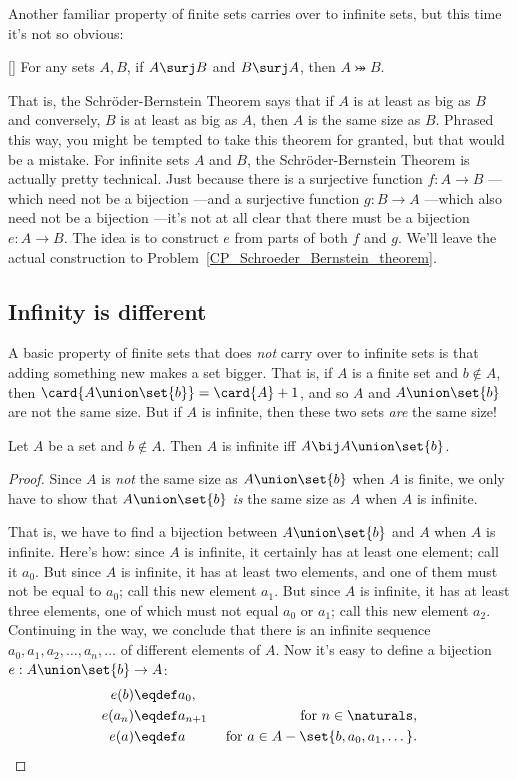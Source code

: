 Another familiar property of finite sets carries over to infinite sets,
but this time it's not so obvious:
\begin{theorem}\label{S-B_thm} \mbox{}
 [] For any sets $A,B$, if $A \surj B$ and
 $B \surj A$, then $A \bij B$.
\end{theorem}

That is, the Schr\"oder-Bernstein Theorem says that if $A$ is at least as
big as $B$ and conversely, $B$ is at least as big as $A$, then $A$ is the
same size as $B$.  Phrased this way, you might be tempted to take this
theorem for granted, but that would be a mistake.  For infinite sets $A$
and $B$, the Schr\"oder-Bernstein Theorem is actually pretty technical.
Just because there is a surjective function $f:A\to B$ ---which need not
be a bijection ---and a surjective function $g:B \to A$ ---which also need
not be a bijection ---it's not at all clear that there must be a bijection
$e:A \to B$.  The idea is to construct $e$ from parts of both $f$ and $g$.
We'll leave the actual construction to
Problem~\ref{CP_Schroeder_Bernstein_theorem}.

\subsection{Infinity is different}

A basic property of finite sets that does \emph{not} carry over to
infinite sets is that adding something new makes a set bigger.  That is,
if $A$ is a finite set and $b \notin A$, then $\card{A \union \set{b}} =
\card{A}+1$, and so $A$ and $A \union \set{b}$ are not the same size.  But
if $A$ is infinite, then these two sets \emph{are} the same size!

\begin{lemma}\label{AUb}
  Let $A$ be a set and $b \notin A$.  Then $A$ is infinite iff $A \bij A
  \union \set{b}$.
\end{lemma}
\begin{proof}
  Since $A$ is \emph{not} the same size as $A \union \set{b}$ when $A$ is
  finite, we only have to show that $A \union \set{b}$ \emph{is} the same
  size as $A$ when $A$ is infinite.

That is, we have to find a bijection between $A \union \set{b}$ and $A$
when $A$ is infinite.  Here's how: since $A$ is infinite, it certainly has
at least one element; call it $a_0$.  But since $A$ is infinite, it has at
least two elements, and one of them must not be equal to $a_0$; call this
new element $a_1$.  But since $A$ is infinite, it has at least three
elements, one of which must not equal $a_0$ or $a_1$; call this new
element $a_2$.  Continuing in the way, we conclude that there is an
infinite sequence $a_0,a_1,a_2,\dots,a_n,\dots$ of different elements of
$A$.  Now it's easy to define a bijection $e: A \union \set{b} \to A$:
\begin{align*}
e(b) & \eqdef a_0,\\
e(a_n) & \eqdef a_{n+1}  &\text{ for } n \in \naturals,\\
e(a) & \eqdef a & \text{ for } a \in A - \set{b,a_0,a_1,\dots}.
\end{align*}
\end{proof}

